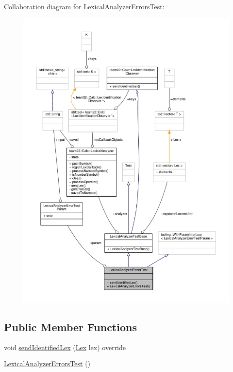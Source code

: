 Collaboration diagram for Lexical\+Analyzer\+Errors\+Test\+:
\nopagebreak
\begin{figure}[H]
\begin{center}
\leavevmode
\includegraphics[width=350pt]{struct_lexical_analyzer_errors_test__coll__graph}
\end{center}
\end{figure}
\subsection*{Public Member Functions}
\begin{DoxyCompactItemize}
\item 
void \hyperlink{struct_lexical_analyzer_errors_test_ac943a4238a0eb77957e2027740603c44}{send\+Identified\+Lex} (\hyperlink{classteam22_1_1_calc_1_1_lex}{Lex} lex) override
\item 
\hyperlink{struct_lexical_analyzer_errors_test_ae4fdca5d1de2494ca722d4683e62bc16}{Lexical\+Analyzer\+Errors\+Test} ()
\end{DoxyCompactItemize}
